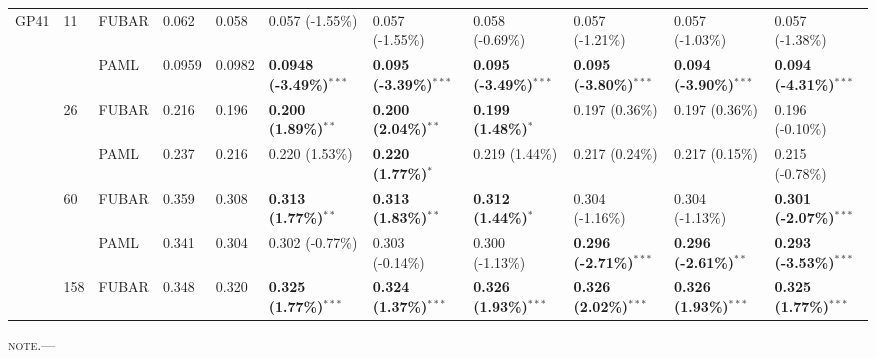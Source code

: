 \documentclass[11pt]{article}
\begin{document}
\begin{sidewaystable}[htbp]
\begin{adjustwidth}{-2.25cm}{}
\begin{tabular}{l l l l l l l l l l l}
GP41  &  11 &  FUBAR  &  0.062  &  0.058  &  0.057 (-1.55\%)  &  0.057 (-1.55\%)  &  0.058 (-0.69\%)  &  0.057 (-1.21\%)  &  0.057 (-1.03\%)  &  0.057 (-1.38\%)  \\
  &    &  PAML        &  0.0959  &  0.0982  &  \textbf{0.0948 (-3.49\%)}$^{\ast\ast\ast}$  &  \textbf{0.095 (-3.39\%)}$^{\ast\ast\ast}$  &  \textbf{0.095 (-3.49\%)}$^{\ast\ast\ast}$  &  \textbf{0.095 (-3.80\%)}$^{\ast\ast\ast}$  &  \textbf{0.094 (-3.90\%)}$^{\ast\ast\ast}$  &  \textbf{0.094 (-4.31\%)}$^{\ast\ast\ast}$  \\
\hline
  &  26  &  FUBAR     &  0.216  &  0.196  &  \textbf{0.200 (1.89\%)}$^{\ast\ast}$  &  \textbf{0.200 (2.04\%)}$^{\ast\ast}$  &  \textbf{0.199 (1.48\%)}$^{\ast}$  &  0.197 (0.36\%)  &  0.197 (0.36\%)  &  0.196 (-0.10\%)  \\ 
  &    &  PAML        &  0.237  &  0.216  &  0.220 (1.53\%)  &  \textbf{0.220 (1.77\%)}$^{\ast}$  &  0.219 (1.44\%)  &  0.217 (0.24\%)  &  0.217 (0.15\%)  &  0.215 (-0.78\%)  \\ 
\hline
  &  60  &  FUBAR     &  0.359  &  0.308  &  \textbf{0.313 (1.77\%)}$^{\ast\ast}$  &  \textbf{0.313 (1.83\%)}$^{\ast\ast}$  &  \textbf{0.312 (1.44\%)}$^{\ast}$  &  0.304 (-1.16\%)  &  0.304 (-1.13\%)  &  \textbf{0.301 (-2.07\%)}$^{\ast\ast\ast}$  \\
  &    &  PAML        &  0.341  &  0.304  &  0.302 (-0.77\%)  &  0.303 (-0.14\%)  &  0.300 (-1.13\%)  &  \textbf{0.296 (-2.71\%)}$^{\ast\ast\ast}$  &  \textbf{0.296 (-2.61\%)}$^{\ast\ast}$  &  \textbf{0.293 (-3.53\%)}$^{\ast\ast\ast}$  \\
\hline
  &  158  &  FUBAR    &  0.348  &  0.320  &  \textbf{0.325 (1.77\%)}$^{\ast\ast\ast}$  &  \textbf{0.324 (1.37\%)}$^{\ast\ast\ast}$  &  \textbf{0.326 (1.93\%)}$^{\ast\ast\ast}$  &  \textbf{0.326 (2.02\%)}$^{\ast\ast\ast}$  &  \textbf{0.326 (1.93\%)}$^{\ast\ast\ast}$  &  \textbf{0.325 (1.77\%)}$^{\ast\ast\ast}$  \\
\hline
\end{tabular}
\newline
\textsc{note.}--- %
\end{adjustwidth}
\end{sidewaystable}
\end{document}
